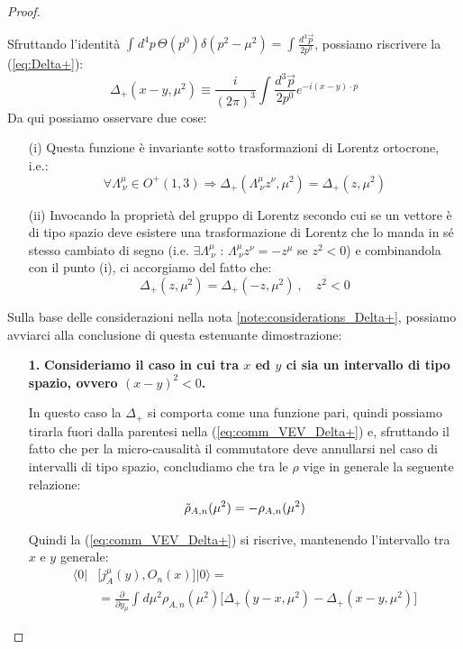 \documentclass[../main.tex]{subfiles}
\begin{document}
\begin{proof}
    \begin{nota}
        Sfruttando l'identità $\int_{}d^4p\,\Theta(p^0)\delta(p^2-\mu^2) = \int_{}\frac{d^3\Vec{p}}{2p^0}$, possiamo riscrivere la (\ref{eq:Delta+}):
        \[
        \Delta_+(x-y,\mu^2) \equiv \frac{i}{(2\pi)^3}\int_{}\frac{d^3\Vec{p}}{2p^0}e^{-i(x-y)\cdot p}
        \]
        Da qui possiamo osservare due cose:
        \begin{itemize}
            \item[(i)] Questa funzione è invariante sotto trasformazioni di Lorentz ortocrone, i.e.:
            \[
            \forall \Lambda^\mu_{~\nu}\in O^+(1,3) \Rightarrow\Delta_+(\Lambda^\mu_{~\nu}z^\nu,\mu^2) = \Delta_+(z,\mu^2)
            \]
            \item[(ii)] Invocando la proprietà del gruppo di Lorentz secondo cui se un vettore è di tipo spazio deve esistere una trasformazione di Lorentz che lo manda in sé stesso cambiato di segno (i.e. $\exists \Lambda^\mu_{~\nu}$ : $\Lambda^\mu_{~\nu}z^\nu = -z^\mu$ se $z^2<0$) e combinandola con il punto (i), ci accorgiamo del fatto che:
            \[
            \Delta_+(z,\mu^2) = \Delta_+(-z,\mu^2)~,\quad z^2<0
            \]
        \end{itemize}
        \label{note:considerations_Delta+}
    \end{nota}
    Sulla base delle considerazioni nella nota \ref{note:considerations_Delta+}, possiamo avviarci alla conclusione di questa estenuante dimostrazione:
    \begin{enumerate}
        \item[\textbf{1.}] \textbf{Consideriamo il caso in cui tra $x$ ed $y$ ci sia un intervallo di tipo spazio, ovvero $(x-y)^2<0$.}

        In questo caso la $\Delta_+$ si comporta come una funzione pari, quindi possiamo tirarla fuori dalla parentesi nella (\ref{eq:comm_VEV_Delta+}) e, sfruttando il fatto che per la micro-causalità il commutatore deve annullarsi nel caso di intervalli di tipo spazio, concludiamo che tra le $\rho$ vige in generale la seguente relazione:
        \begin{equation}
            \Tilde{\rho}_{A,n}(\mu^2) = - {\rho}_{A,n}(\mu^2)
            \label{eq:rho_rels}
        \end{equation}

        Quindi la (\ref{eq:comm_VEV_Delta+}) si riscrive, mantenendo l'intervallo tra $x$ e $y$ generale:
        \begin{equation}
            \boxed{\begin{aligned}
                \langle 0|&\big[j^\mu_A(y), O_n(x)\big]|0\rangle =\\
                &=\frac{\partial}{\partial y_\mu}\int_{}d\mu^2{\rho}_{A,n}(\mu^2)\big[\Delta_+(y-x, \mu^2) - \Delta_+(x-y, \mu^2)\big]
            \end{aligned}}
            \label{eq:comm_VEV_Delta+_revised}
        \end{equation}
        

\end{enumerate}
\end{proof}
\end{document}

